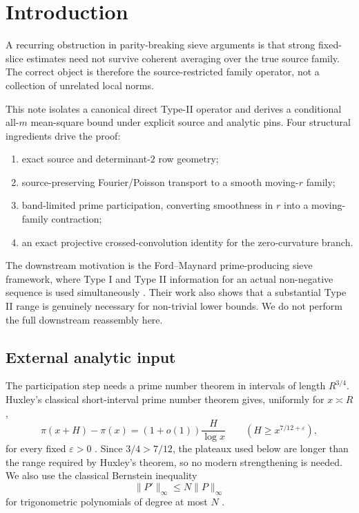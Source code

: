 \documentclass[11pt]{article}
\theoremstyle{definition}
\newcommand{\1}{\mathbf 1}
\begin{document}
\begin{abstract}
No claim of Gate-1B closure, Full Type-II reassembly, a Hardy--Littlewood
prime-pair asymptotic, or twin-prime infinitude is made.
\end{abstract}

\tableofcontents
\section{Introduction}
A recurring obstruction in parity-breaking sieve arguments is that strong
fixed-slice estimates need not survive coherent averaging over the true source
family. The correct object is therefore the source-restricted family operator,
not a collection of unrelated local norms.

This note isolates a canonical direct Type-II operator and derives a conditional
all-$m$ mean-square bound under explicit source and analytic pins. Four structural ingredients drive the proof:
\begin{enumerate}[label=(\roman*)]
  \item exact source and determinant-$2$ row geometry;
  \item source-preserving Fourier/Poisson transport to a smooth moving-$r$
        family;
  \item band-limited prime participation, converting smoothness in $r$ into a
        moving-family contraction;
  \item an exact projective crossed-convolution identity for the zero-curvature
        branch.
\end{enumerate}

The downstream motivation is the Ford--Maynard prime-producing sieve
framework, where Type I and Type II information for an actual non-negative
sequence is used simultaneously \cite{FordMaynard2024}. Their work also shows
that a substantial Type II range is genuinely necessary for non-trivial lower
bounds. We do not perform the full downstream reassembly here.

\subsection{External analytic input}
The participation step needs a prime number theorem in intervals of length
$R^{3/4}$.  Huxley's classical short-interval prime number theorem gives,
uniformly for $x\asymp R$,
\[
   \pi(x+H)-\pi(x)=(1+o(1))\frac{H}{\log x}
   \qquad(H\ge x^{7/12+\varepsilon}),
\]
for every fixed $\varepsilon>0$ \cite{Huxley1972}.  Since $3/4>7/12$, the
plateaux used below are longer than the range required by Huxley's theorem,
so no modern strengthening is needed.  We also use the classical Bernstein
inequality
\[
   \|P'\|_\infty\le N\|P\|_\infty
\]
for trigonometric polynomials of degree at most $N$ \cite{Zygmund2002}.
\end{document}
